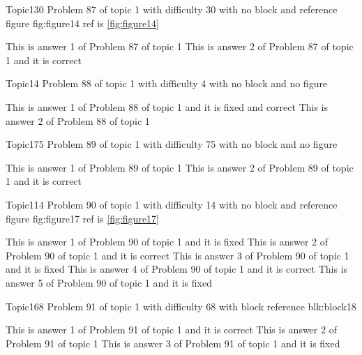 \documentclass[master]{exam}
\begin{document}
\begin{problem}{Topic1}{30}
	Problem 87 of topic 1 with difficulty 30 with no block and reference figure fig:figure14 ref is \ref{fig:figure14}
	\begin{answers}
		\answer This is answer 1 of Problem 87 of topic 1 
		\answer[correct] This is answer 2 of Problem 87 of topic 1 and it is correct
	\end{answers}
\end{problem}

\begin{problem}{Topic1}{4}
	Problem 88 of topic 1 with difficulty 4 with no block and no figure
	\begin{answers}
		 This is answer 1 of Problem 88 of topic 1 and it is fixed and correct
		\answer This is answer 2 of Problem 88 of topic 1 
	\end{answers}
\end{problem}

\begin{problem}{Topic1}{75}
	Problem 89 of topic 1 with difficulty 75 with no block and no figure
	\begin{answers}
		\answer This is answer 1 of Problem 89 of topic 1 
		\answer[correct] This is answer 2 of Problem 89 of topic 1 and it is correct
	\end{answers}
\end{problem}

\begin{problem}{Topic1}{14}
	Problem 90 of topic 1 with difficulty 14 with no block and reference figure fig:figure17 ref is \ref{fig:figure17}
	\begin{answers}
		\answer[fixed] This is answer 1 of Problem 90 of topic 1 and it is fixed
		\answer[correct] This is answer 2 of Problem 90 of topic 1 and it is correct
		\answer[fixed] This is answer 3 of Problem 90 of topic 1 and it is fixed
		\answer[correct] This is answer 4 of Problem 90 of topic 1 and it is correct
		\answer[fixed] This is answer 5 of Problem 90 of topic 1 and it is fixed
	\end{answers}
\end{problem}

\begin{problem}[requires=blk:block18]{Topic1}{68}
	Problem 91 of topic 1 with difficulty 68 with block reference blk:block18
	\begin{answers}
		\answer[correct] This is answer 1 of Problem 91 of topic 1 and it is correct
		\answer This is answer 2 of Problem 91 of topic 1 
		\answer[fixed] This is answer 3 of Problem 91 of topic 1 and it is fixed
	\end{answers}
\end{problem}
\end{document}
